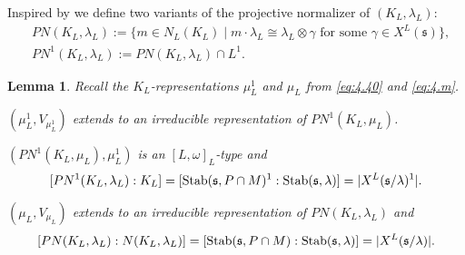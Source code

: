\documentclass[11pt]{amsart}
\newtheorem{lem}[thm]{Lemma}
\theoremstyle{definition}
\begin{document}
Inspired by \cite{BuKu2} we define two variants of the projective normalizer of
$(K_L,\lambda_L)$: \label{i:42}\label{i:43}
\begin{align*}
& PN (K_L,\lambda_L) := \{ m \in N_L (K_L) \mid m \cdot \lambda_L \cong
\lambda_L \otimes \gamma \text{ for some } \gamma \in X^L ({{\mathfrak s}}) \} , \\
& PN^1 (K_L,\lambda_L) := PN (K_L,\lambda_L) \cap L^1 .
\end{align*}

\begin{lem}\label{lem:3.4}
Recall the $K_L$-representations $\mu_L^1$ and 
$\mu_L$ from \eqref{eq:4.40} and \eqref{eq:4.m}.
{\begin{enumerate} {{
\item $(\mu_L^1, V_{\mu_L^1})$ extends to an irreducible  
representation of $PN^1 (K_L,\mu_L)$.
\item $(PN^1 (K_L,\mu_L),\mu_L^1)$ is an $[L,\omega]_L$-type and 
\[
[PN^1 (K_L,\lambda_L) : K_L] = [{{\rm Stab}} ({{\mathfrak s}},P \cap M)^1 : {{\rm Stab}} ({{\mathfrak s}},\lambda)] = 
| X^L ({{\mathfrak s}} / \lambda)^1 | .
\]
\item $(\mu_L, V_{\mu_L })$ extends to an irreducible 
representation of $PN (K_L,\lambda_L)$ and
\[
[PN (K_L,\lambda_L) : N (K_L,\lambda_L)] = 
[{{\rm Stab}} ({{\mathfrak s}},P \cap M) : {{\rm Stab}} ({{\mathfrak s}},\lambda)] = | X^L ({{\mathfrak s}} / \lambda) | .
\]
}} \end{enumerate}}
\end{lem}
\end{document}
